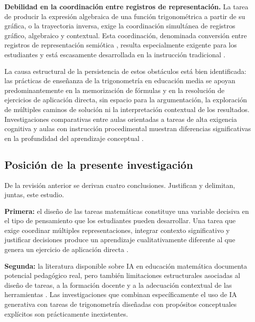 \textbf{Debilidad en la coordinación entre registros de representación.} La tarea de producir la expresión algebraica de una función trigonométrica a partir de su gráfica, o la trayectoria inversa, exige la coordinación simultánea de registros gráfico, algebraico y contextual. Esta coordinación, denominada conversión entre registros de representación semiótica \parencite{duval2006}, resulta especialmente exigente para los estudiantes y está escasamente desarrollada en la instrucción tradicional \parencite{fialloGutierrezCognitiveUnity2017}.

La causa estructural de la persistencia de estos obstáculos está bien identificada: las prácticas de enseñanza de la trigonometría en educación media se apoyan predominantemente en la memorización de fórmulas y en la resolución de ejercicios de aplicación directa, sin espacio para la argumentación, la exploración de múltiples caminos de solución ni la interpretación contextual de los resultados. Investigaciones comparativas entre aulas orientadas a tareas de alta exigencia cognitiva y aulas con instrucción procedimental muestran diferencias significativas en la profundidad del aprendizaje conceptual \parencite{leungDesigningMathematicsTasks2015, radmehrTheoreticalFrameworkTask2023, orozcoImpactProblemSolving2025}.

\subsection{Posición de la presente investigación}

De la revisión anterior se derivan cuatro conclusiones. Justifican y delimitan, juntas, este estudio.

\textbf{Primera:} el diseño de las tareas matemáticas constituye una variable decisiva en el tipo de pensamiento que los estudiantes pueden desarrollar. Una tarea que exige coordinar múltiples representaciones, integrar contexto significativo y justificar decisiones produce un aprendizaje cualitativamente diferente al que genera un ejercicio de aplicación directa \parencite{leungDesigningMathematicsTasks2015, canogullariTaskDesignPrinciples2025}.

\textbf{Segunda:} la literatura disponible sobre IA en educación matemática documenta potencial pedagógico real, pero también limitaciones estructurales asociadas al diseño de tareas, a la formación docente y a la adecuación contextual de las herramientas \parencite{cromptonAffordancesChallengesArtificial2022}. Las investigaciones que combinan específicamente el uso de IA generativa con tareas de trigonometría diseñadas con propósitos conceptuales explícitos son prácticamente inexistentes.

